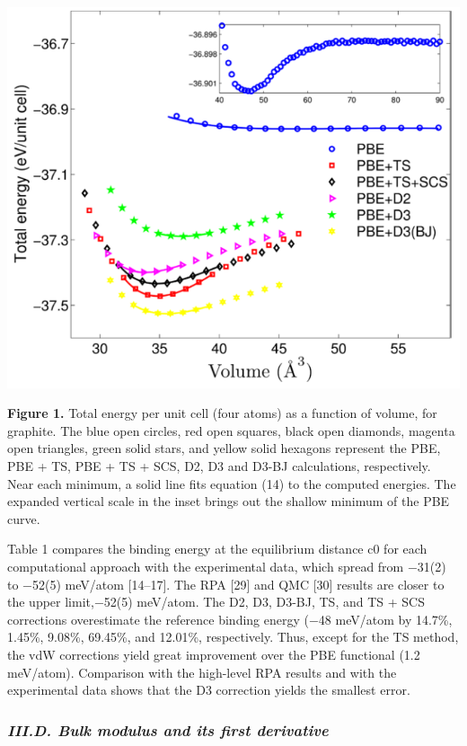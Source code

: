 \documentclass{article}
\begin{document}
\includegraphics{_page_7_Figure_1.png}


\textbf{Figure 1.} Total energy per unit cell (four atoms) as a function of volume, for graphite. The blue open circles, red open squares, black open diamonds, magenta open triangles, green solid stars, and yellow solid hexagons represent the PBE, PBE + TS, PBE + TS + SCS, D2, D3 and D3-BJ calculations, respectively. Near each minimum, a solid line fits equation (14) to the computed energies. The expanded vertical scale in the inset brings out the shallow minimum of the PBE curve.

Table 1 compares the binding energy at the equilibrium distance c0 for each computational approach with the experimental data, which spread from −31(2) to −52(5) meV/atom [14–17]. The RPA [29] and QMC [30] results are closer to the upper limit,−52(5) meV/atom. The D2, D3, D3-BJ, TS, and TS + SCS corrections overestimate the reference binding energy (−48 meV/atom by 14.7\%, 1.45\%, 9.08\%, 69.45\%, and 12.01\%, respectively. Thus, except for the TS method, the vdW corrections yield great improvement over the PBE functional (1.2 meV/atom). Comparison with the high-level RPA results and with the experimental data shows that the D3 correction yields the smallest error.

\subsubsection{\textit{III.D. Bulk modulus and its first derivative}}
\end{document}
